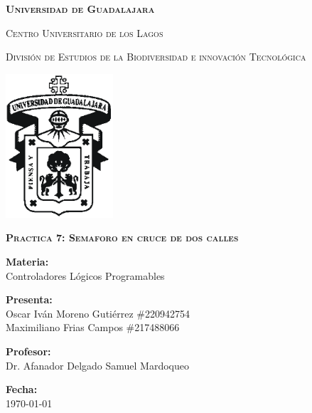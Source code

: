 \documentclass[12pt]{report}
\begin{document}
\setlength{\hoffset}{27 pt} %
\begin{titlepage}
{\centering
{\scshape\bfseries\fontsize{29.16}{34.992}\selectfont Universidad de Guadalajara \par}
\vspace{0.5cm}
{\scshape\Large Centro Universitario de los Lagos \par}
\vspace{1cm}
{\scshape\Large División de Estudios de la Biodiversidad e innovación Tecnológica \par}
\vspace{1cm}
{\graphicspath{{imagenes/Portada}} %
\includegraphics[width=0.3\textwidth]{image.png}\par}
\vspace{1cm}
{\scshape\large\bfseries Practica 7: Semaforo en cruce de dos calles\par}
\vspace{0.5cm}
{\large \textbf{Materia:} \\Controladores Lógicos Programables\par}
\vfill
{\large \textbf{Presenta:} \\Oscar Iván Moreno Gutiérrez \#220942754
\\Maximiliano Frias Campos \#217488066
\par}
\vfill
{\large \textbf{Profesor:} \\Dr. Afanador Delgado Samuel Mardoqueo \par}
\vfill
\vfill
\begin{flushright}
  {\normalsize \textbf {Fecha:} \\ \today}
\end{flushright}
\vfill}
{\large  \par}
\end{titlepage}
\end{document}
